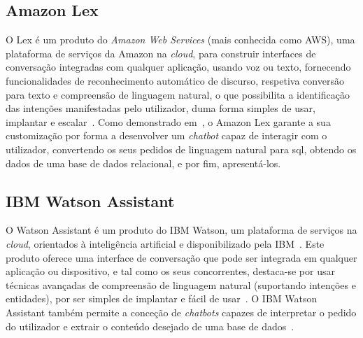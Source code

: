 \subsection{Amazon Lex}
O Lex é um produto do \textit{Amazon Web Services} (mais conhecida como AWS), uma plataforma de serviços da Amazon na \textit{cloud}, para construir interfaces de conversação integradas com qualquer aplicação, usando voz ou texto, fornecendo funcionalidades de reconhecimento automático de discurso, respetiva conversão para texto e compreensão de linguagem natural, o que possibilita a identificação das intenções manifestadas pelo utilizador, duma forma simples de usar, implantar e escalar~\parencite{amazon_lex_official}. Como demonstrado em~\textcite{aws_ml_blog_conversational_business}, o Amazon Lex garante a sua customização por forma a desenvolver um \textit{chatbot} capaz de interagir com o utilizador, convertendo os seus pedidos de linguagem natural para \gls{sql}, obtendo os dados de uma base de dados relacional, e por fim, apresentá-los.

\subsection{IBM Watson Assistant}
O Watson Assistant é um produto do IBM Watson, um plataforma de serviços na \textit{cloud}, orientados à inteligência artificial e disponibilizado pela IBM~\parencite{ibm_watson_official}. Este produto oferece uma interface de conversação que pode ser integrada em qualquer aplicação ou dispositivo, e tal como os seus concorrentes, destaca-se por usar técnicas avançadas de compreensão de linguagem natural (suportando intenções e entidades), por ser simples de implantar e fácil de usar~\parencite{ibm_watson_assistant_official}. O IBM Watson Assistant também permite a conceção de \textit{chatbots} capazes de interpretar o pedido do utilizador e extrair o conteúdo desejado de uma base de dados~\parencite{ibm_watson_assistant_database_driven_chatbot}.

